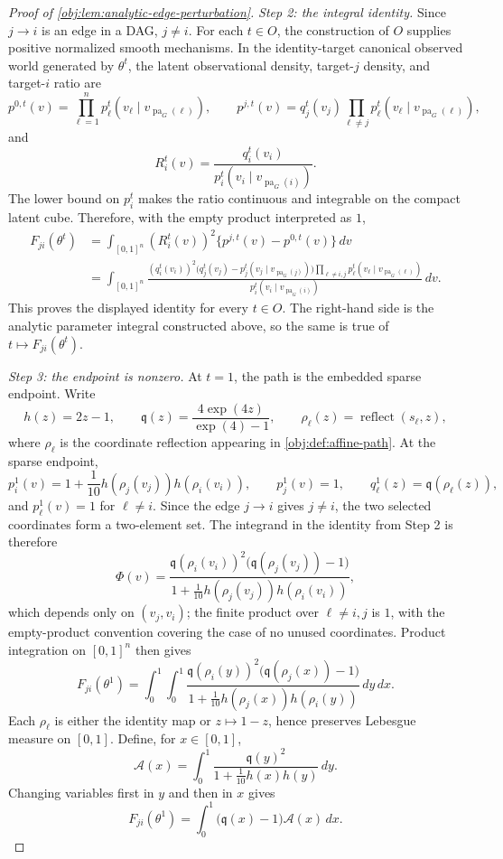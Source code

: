 \begin{proof}[Proof of \cref{obj:lem:analytic-edge-perturbation}]
\emph{Step 2: the integral identity.}
Since \(j\to i\) is an edge in a DAG, \(j\ne i\).  For each \(t\in O\), the construction of \(O\) supplies positive normalized smooth mechanisms.  In the identity-target canonical observed world generated by \(\theta^t\), the latent observational density, target-\(j\) density, and target-\(i\) ratio are
\[
p^{0,t}(v)=\prod_{\ell=1}^n p_\ell^t(v_\ell\mid v_{\operatorname{pa}_G(\ell)}),
\qquad
p^{j,t}(v)=q_j^t(v_j)\prod_{\ell\ne j}p_\ell^t(v_\ell\mid v_{\operatorname{pa}_G(\ell)}),
\]
and
\[
R_i^t(v)=\frac{q_i^t(v_i)}
{p_i^t(v_i\mid v_{\operatorname{pa}_G(i)})}.
\]
The lower bound on \(p_i^t\) makes the ratio continuous and integrable on the compact latent cube.  Therefore, with the empty product interpreted as \(1\),
\[
\begin{aligned}
F_{ji}(\theta^t)
&=\int_{[0,1]^n}(R_i^t(v))^2\{p^{j,t}(v)-p^{0,t}(v)\}\,dv\\
&=\int_{[0,1]^n}
\frac{(q_i^t(v_i))^2
\bigl(q_j^t(v_j)-p_j^t(v_j\mid v_{\operatorname{pa}_G(j)})\bigr)
\prod_{\ell\ne i,j}p_\ell^t(v_\ell\mid v_{\operatorname{pa}_G(\ell)})}
{p_i^t(v_i\mid v_{\operatorname{pa}_G(i)})}\,dv .
\end{aligned}
\]
This proves the displayed identity for every \(t\in O\).  The right-hand side is the analytic parameter integral constructed above, so the same is true of \(t\mapsto F_{ji}(\theta^t)\). %

\emph{Step 3: the endpoint is nonzero.}
At \(t=1\), the path is the embedded sparse endpoint.  Write
\[
h(z)=2z-1,
\qquad
\mathfrak q(z)=\frac{4\exp(4z)}{\exp(4)-1},
\qquad
\rho_\ell(z)=\operatorname{reflect}(s_\ell,z),
\]
where \(\rho_\ell\) is the coordinate reflection appearing in \cref{obj:def:affine-path}.  At the sparse endpoint,
\[
p_i^1(v)=1+\frac{1}{10}h(\rho_j(v_j))h(\rho_i(v_i)),
\qquad
p_j^1(v)=1,
\qquad
q_\ell^1(z)=\mathfrak q(\rho_\ell(z)),
\]
and \(p_\ell^1(v)=1\) for \(\ell\ne i\).  Since the edge \(j\to i\) gives \(j\ne i\), the two selected coordinates form a two-element set.  The integrand in the identity from Step 2 is therefore
\[
\Phi(v)=
\frac{\mathfrak q(\rho_i(v_i))^2\bigl(\mathfrak q(\rho_j(v_j))-1\bigr)}
{1+\frac{1}{10}h(\rho_j(v_j))h(\rho_i(v_i))},
\]
which depends only on \((v_j,v_i)\); the finite product over \(\ell\ne i,j\) is \(1\), with the empty-product convention covering the case of no unused coordinates.  Product integration on \([0,1]^n\) then gives
\[
F_{ji}(\theta^1)
=\int_0^1\!\int_0^1
\frac{\mathfrak q(\rho_i(y))^2\bigl(\mathfrak q(\rho_j(x))-1\bigr)}
{1+\frac{1}{10}h(\rho_j(x))h(\rho_i(y))}\,dy\,dx .
\]
Each \(\rho_\ell\) is either the identity map or \(z\mapsto1-z\), hence preserves Lebesgue measure on \([0,1]\).  Define, for \(x\in[0,1]\),
\[
\mathcal A(x)=\int_0^1
\frac{\mathfrak q(y)^2}
{1+\frac{1}{10}h(x)h(y)}\,dy .
\]
Changing variables first in \(y\) and then in \(x\) gives
\[
F_{ji}(\theta^1)
=\int_0^1 \bigl(\mathfrak q(x)-1\bigr)\mathcal A(x)\,dx .
\]


\end{proof}
